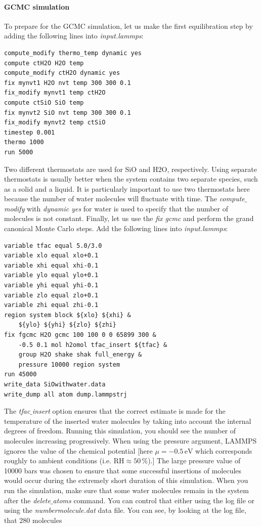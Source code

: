 \documentclass[9pt,tutorial]{livecoms}
\begin{document}
\paragraph{GCMC simulation}
To prepare for the GCMC simulation, let us make the first equilibration step by adding the following lines into \textit{input.lammps}:
{\normalsize \begin{verbatim}
compute_modify thermo_temp dynamic yes
compute ctH2O H2O temp
compute_modify ctH2O dynamic yes
fix mynvt1 H2O nvt temp 300 300 0.1
fix_modify mynvt1 temp ctH2O
compute ctSiO SiO temp
fix mynvt2 SiO nvt temp 300 300 0.1
fix_modify mynvt2 temp ctSiO
timestep 0.001
thermo 1000
run 5000
\end{verbatim}}
Two different thermostats are used for SiO and H2O, respectively. Using separate thermostats is usually better when the system contains two separate species, such as a solid and a liquid. It is particularly important to use two thermostats
here because the number of water molecules will fluctuate with time. The \textit{compute$\_$modify} with 
\textit{dynamic yes} for water is used to specify that the number of molecules is not constant. Finally, let us use the \textit{fix gcmc} and perform the grand canonical Monte Carlo steps. Add the following lines into \textit{input.lammps}:
{\normalsize \begin{verbatim}
variable tfac equal 5.0/3.0
variable xlo equal xlo+0.1
variable xhi equal xhi-0.1
variable ylo equal ylo+0.1
variable yhi equal yhi-0.1
variable zlo equal zlo+0.1
variable zhi equal zhi-0.1
region system block ${xlo} ${xhi} &
    ${ylo} ${yhi} ${zlo} ${zhi} 
fix fgcmc H2O gcmc 100 100 0 0 65899 300 &
    -0.5 0.1 mol h2omol tfac_insert ${tfac} &
    group H2O shake shak full_energy &
    pressure 10000 region system
run 45000
write_data SiOwithwater.data
write_dump all atom dump.lammpstrj
\end{verbatim}}
The \textit{tfac$\_$insert} option ensures that the correct estimate is made for the temperature of the inserted water molecules by taking into account the internal degrees of freedom. Running this simulation, you should see the number of molecules increasing progressively. When using the pressure argument, LAMMPS ignores the value of the chemical potential [here $\mu = -0.5\,\text{eV}$ which corresponds roughly to ambient conditions (i.e. $\text{RH} \approx 50\,\%$).] The large pressure value of 10000 bars was chosen to ensure that some successful insertions of molecules would occur during the 
extremely short duration of this simulation. When you run the simulation, make sure that some water molecules remain in the system after the \textit{delete$\_$atoms} command. You can control that either using the log file or using the \textit{numbermolecule.dat} data file. You can see, by looking at the log file, that 280 molecules
\end{document}
